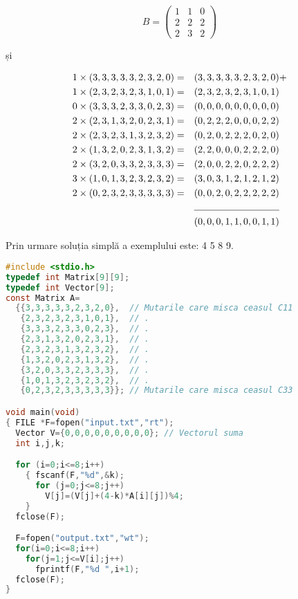 \begin{equation}
  B =
  \begin{pmatrix}
    1 & 1 & 0 \\
    2 & 2 & 2 \\
    2 & 3 & 2
  \end{pmatrix}
\end{equation}

și

\begin{align*}
1 & \times (3,3,3,3,3,2,3,2,0) = & (3,3,3,3,3,2,3,2,0) & + \\
1 & \times (2,3,2,3,2,3,1,0,1) = & (2,3,2,3,2,3,1,0,1) & \\
0 & \times (3,3,3,2,3,3,0,2,3) = & (0,0,0,0,0,0,0,0,0) & \\
2 & \times (2,3,1,3,2,0,2,3,1) = & (0,2,2,2,0,0,0,2,2) & \\
2 & \times (2,3,2,3,1,3,2,3,2) = & (0,2,0,2,2,2,0,2,0) & \\
2 & \times (1,3,2,0,2,3,1,3,2) = & (2,2,0,0,0,2,2,2,0) & \\
2 & \times (3,2,0,3,3,2,3,3,3) = & (2,0,0,2,2,0,2,2,2) & \\
3 & \times (1,0,1,3,2,3,2,3,2) = & (3,0,3,1,2,1,2,1,2) & \\
2 & \times (0,2,3,2,3,3,3,3,3) = & (0,0,2,0,2,2,2,2,2) & \\
\cline{3-3}
  &                              & (0,0,0,1,1,0,0,1,1) &
\end{align*}

Prin urmare soluția simplă a exemplului este: 4 5 8 9.

\begin{lstlisting}[language=C]
#include <stdio.h>
typedef int Matrix[9][9];
typedef int Vector[9];
const Matrix A=
  {{3,3,3,3,3,2,3,2,0},  // Mutarile care misca ceasul C11
   {2,3,2,3,2,3,1,0,1},  // .
   {3,3,3,2,3,3,0,2,3},  // .
   {2,3,1,3,2,0,2,3,1},  // .
   {2,3,2,3,1,3,2,3,2},  // .
   {1,3,2,0,2,3,1,3,2},  // .
   {3,2,0,3,3,2,3,3,3},  // .
   {1,0,1,3,2,3,2,3,2},  // .
   {0,2,3,2,3,3,3,3,3}}; // Mutarile care misca ceasul C33

void main(void)
{ FILE *F=fopen("input.txt","rt");
  Vector V={0,0,0,0,0,0,0,0,0}; // Vectorul suma
  int i,j,k;

  for (i=0;i<=8;i++)
    { fscanf(F,"%d",&k);
      for (j=0;j<=8;j++)
        V[j]=(V[j]+(4-k)*A[i][j])%4;
    }
  fclose(F);

  F=fopen("output.txt","wt");
  for(i=0;i<=8;i++)
    for(j=1;j<=V[i];j++)
      fprintf(F,"%d ",i+1);
  fclose(F);
}
\end{lstlisting}
